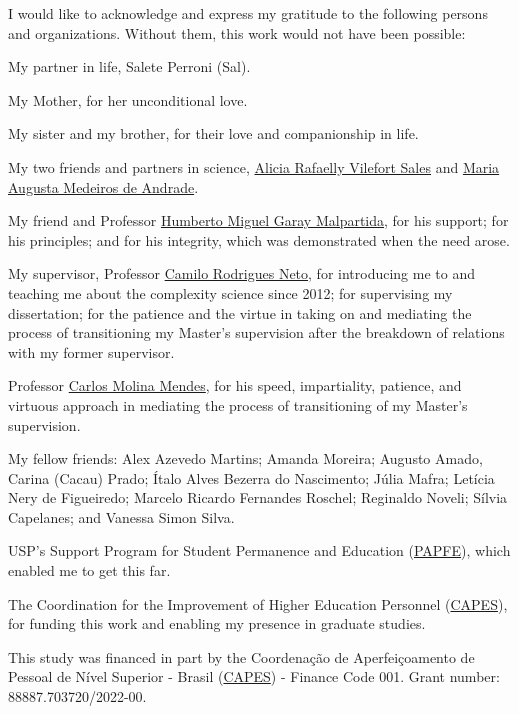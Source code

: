 \documentclass[
12pt,
openright,
oneside,
a4paper,
chapter=TITLE,
section=TITLE,
french,
spanish,
brazil,
english
]{abntex2}\usepackage{array}
\renewcommand{\baselinestretch}{1.5}
\renewcommand{\agradecimentosname}{Acknowledgements}
\renewcommand{\agradecimentosname}{Agradecimentos}
\renewcommand{\agradecimentosname}{Agradecimientos}
\begin{document}
\begin{agradecimentos}[\agradecimentosname]

I would like to acknowledge and express my gratitude to the following
persons and organizations. Without them, this work would not have been
possible:

\smallskip

My partner in life, Salete Perroni (Sal).

My Mother, for her unconditional love.

My sister and my brother, for their love and companionship in life.

My two friends and partners in science,
\href{https://orcid.org/0000-0003-0004-4487}{Alicia Rafaelly Vilefort
Sales} and \href{https://orcid.org/0000-0002-9283-9967}{Maria Augusta
Medeiros de Andrade}.

My friend and Professor
\href{https://orcid.org/0000-0002-1164-2055}{Humberto Miguel Garay
Malpartida}, for his support; for his principles; and for his integrity,
which was demonstrated when the need arose.

My supervisor, Professor
\href{https://orcid.org/0000-0001-6783-6695}{Camilo Rodrigues Neto}, for
introducing me to and teaching me about the complexity science since
2012; for supervising my dissertation; for the patience and the virtue
in taking on and mediating the process of transitioning my Master's
supervision after the breakdown of relations with my former supervisor.

Professor \href{https://orcid.org/0000-0003-2916-4415}{Carlos Molina
Mendes}, for his speed, impartiality, patience, and virtuous approach in
mediating the process of transitioning of my Master's supervision.

My fellow friends: Alex Azevedo Martins; Amanda Moreira; Augusto Amado,
Carina (Cacau) Prado; Ítalo Alves Bezerra do Nascimento; Júlia Mafra;
Letícia Nery de Figueiredo; Marcelo Ricardo Fernandes Roschel; Reginaldo
Noveli; Sílvia Capelanes; and Vanessa Simon Silva.

USP's Support Program for Student Permanence and Education
(\href{https://prip.usp.br/apoio-estudantil/}{PAPFE}), which enabled me
to get this far.

The Coordination for the Improvement of Higher Education Personnel
(\href{https://www.gov.br/capes/}{CAPES}), for funding this work and
enabling my presence in graduate studies.

\smallskip
\begingroup
\renewcommand{\baselinestretch}{1}

\noindent This study was financed in part by the Coordenação de
Aperfeiçoamento de Pessoal de Nível Superior - Brasil
(\href{https://www.gov.br/capes/}{CAPES}) - Finance Code 001. Grant
number: 88887.703720/2022-00.

\endgroup

\end{agradecimentos}
\end{document}
